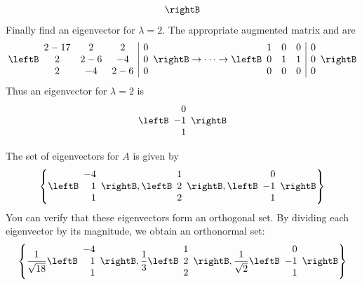 \begin{solution}
\begin{equation*}
\rightB
\end{equation*}
Finally find an eigenvector for $\lambda =2.$ The appropriate augmented
matrix and \rref \;are 
\begin{equation*}
\leftB
\begin{array}{ccc|c}
2-17 & 2 & 2 & 0 \\ 
2 & 2-6 & -4 & 0 \\ 
2 & -4 & 2-6 & 0
\end{array}
\rightB
\rightarrow \cdots \rightarrow
\leftB
\begin{array}{rrr|r}
1 & 0 & 0 & 0 \\ 
0 & 1 & 1 & 0 \\ 
0 & 0 & 0 & 0
\end{array}
\rightB
\end{equation*}
Thus an eigenvector for $\lambda =2$ is 
\begin{equation*}
\leftB
\begin{array}{r}
0 \\ 
-1 \\ 
1
\end{array}
\rightB
\end{equation*}

The set of eigenvectors for $A$ is given by 
\[
\left\{
\leftB
\begin{array}{r}
-4 \\ 
1 \\ 
1
\end{array}
\rightB,
\leftB
\begin{array}{r}
1 \\ 
2 \\ 
2
\end{array}
\rightB,
\leftB
\begin{array}{r}
0 \\ 
-1 \\ 
1
\end{array}
\rightB
\right\}
\]
You can verify that these eigenvectors form an orthogonal set. By dividing each eigenvector by its magnitude, we obtain an orthonormal set: 
\begin{equation*}
\left\{ \frac{1}{\sqrt{18}}\leftB
\begin{array}{r}
-4 \\ 
1 \\ 
1
\end{array}
\rightB ,\frac{1}{3}\leftB 
\begin{array}{r}
1 \\ 
2 \\ 
2
\end{array}
\rightB ,\frac{1}{\sqrt{2}}\leftB 
\begin{array}{r}
0 \\ 
-1 \\ 
1
\end{array}
\rightB \right\}
\end{equation*}
\end{solution}

